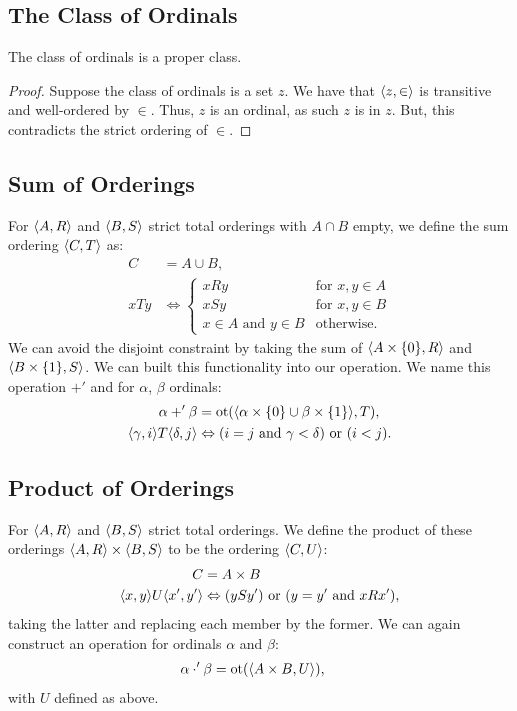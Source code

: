 \subsection{The Class of Ordinals}

The class of ordinals is a proper class.

\begin{proof}
    Suppose the class of ordinals is a set $z$.
    We have that $\langle z, \in \rangle$ is transitive and
    well-ordered by $\in$. Thus, $z$ is an ordinal,
    as such $z$ is in $z$. But, this contradicts the
    strict ordering of $\in$.
\end{proof}

\subsection{Sum of Orderings}

For $\langle A, R \rangle$ and $\langle B, S \rangle$ strict total orderings
with $A \cap B$ empty, we
define the sum ordering $\langle C, T \rangle$ as: \begin{align*}
    C &= A \cup B, \\
    x T y &\Leftrightarrow \begin{cases}
        x R y & \text{for } x, y \in A \\
        x S y & \text{for } x, y \in B \\
        x \in A \text{ and } y \in B & \text{otherwise}.
    \end{cases}
\end{align*} We can avoid the disjoint constraint by taking
the sum of $\langle A \times \{0\}, R \rangle$ and \linebreak
$\langle B \times \{1\}, S \rangle$. We can built this functionality into
our operation. We name this operation $+'$ and for $\alpha$, 
$\beta$ ordinals: \begin{align*}
    \alpha +' \beta &= \operatorname{ot}(\langle 
        \alpha \times \{0\} \cup \beta \times \{1\}
     \rangle, T), \\
    \langle \gamma, i \rangle T\langle \delta, j \rangle 
    &\Leftrightarrow (i = j \text{ and } \gamma < \delta)
    \text{ or } (i < j).
\end{align*}

\subsection{Product of Orderings}

For $\langle A, R \rangle$ and $\langle B, S \rangle$ strict total orderings.
We define the product of these orderings $\langle A, R \rangle \times \langle B, S \rangle$
to be the ordering $\langle C, U \rangle$: \begin{align*}
    C &= A \times B \\
    \langle x, y \rangle U\langle x', y' \rangle 
    &\Leftrightarrow 
    (ySy') \text{ or } (y = y' \text{ and } xRx'),
\end{align*} taking the latter and replacing each member by the former.
We can again construct an operation for ordinals $\alpha$
and $\beta$: \begin{align*}
    \alpha \cdot' \beta &= \operatorname{ot}(\langle A \times B, U \rangle),
\end{align*} with $U$ defined as above.

